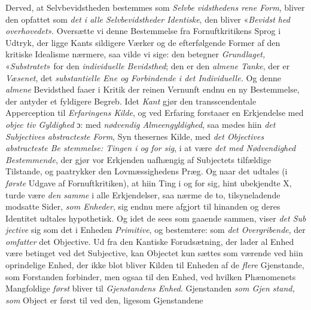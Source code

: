 Derved, at Selvbevidstheden bestemmes som \emph{Selvbe\-%
vidsthedens rene Form}, bliver den opfattet som \emph{det i
alle Selvbevidstheder Identiske}, den bliver «\emph{Bevidst\-%
hed overhovedet}». Oversætte vi denne Bestemmelse fra
Fornuftkritikens Sprog i Udtryk, der ligge Kants sildigere
Værker og de efterfølgende Former af den kritiske Idealisme
nærmere, saa vilde vi sige: den betegner \emph{Grundlaget,}
 \setcounter{footnote}{0}%
«\emph{Substratet}» for den \emph{individuelle Bevidsthed}; den er
den \emph{almene Tanke}, der er \emph{Væsenet}, det \emph{substantielle
Ene og Forbindende i det Individuelle.} Og denne
\emph{almene} Bevidsthed faaer i Kritik der reinen Vernunft endnu
en ny Bestemmelse, der antyder et fyldigere Begreb. Idet
\emph{Kant} gjør den transscendentale Apperception til \emph{Erfaringens
Kilde}, og ved Erfaring forstaaer en Erkjendelse med \emph{objec\-%
tiv Gyldighed} ɔ: med \emph{nødvendig Almeengyldighed}, saa
mødes hiin \emph{det Subjectives abstracteste Form}, Syn\-%
thesernes Kilde, med \emph{det Objectives abstracteste Be\-%
stemmelse: Tingen i og for sig}, i at være \emph{det med
Nødvendighed Bestemmende}, der gjør vor Erkjenden
uafhængig af Subjectets tilfældige Tilstande, og paatrykker
den Lovmæssighedens Præg. Og naar det udtales (i \emph{første}
Udgave af Fornuftkritiken), at hiin Ting i og for sig, hint
ubekjendte X, turde være \emph{den samme} i alle Erkjendelser, saa
nærme de to, tilsyneladende modsatte Sider, \emph{som Enheder},
sig endnu mere afgjort til hinanden og deres Identitet udtales
hypothetisk. Og idet de sees som gaaende sammen, viser \emph{det Sub\-%
jective} sig som det i Enheden \emph{Primitive}, og bestemtere: som
\emph{det Overgribende}, der \emph{omfatter} det Objective. Ud fra
den Kantiske Forudsætning, der lader al Enhed være betinget
ved det Subjective, kan Objectet kun sættes som værende ved
hiin oprindelige Enhed, der ikke blot bliver Kilden til Enheden
af de \emph{flere} Gjenstande, som Forstanden forbinder, men ogsaa
til den Enhed, ved hvilken Phænomenets Mangfoldige \emph{først}
bliver til \emph{Gjenstandens Enhed}. Gjenstanden \emph{som Gjen\-%
stand, som} Object er først til ved den, ligesom Gjenstandene
